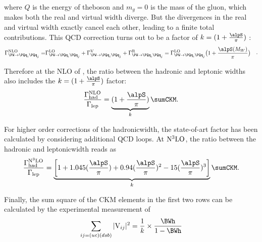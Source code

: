 \noindent  where $Q$ is the energy of the\PW boson and $m_g=0$ is the mass of the gluon, which makes both the real and virtual width diverge. But the divergences in the real and virtual width exactly cancel each other, leading to a finite total contributions. This QCD correction turns out to be a factor of $k=(1+\frac{\alpS}{\pi})$ :
\begin{equation}
\begin{split}
    \Gamma_{\PW \to \PQq_i \PQq_j}^{\rm NLO} =& \Gamma_{\PW \to \PQq_i \PQq_j}^{\rm LO} + \Gamma^{\rm V}_{\PW \to \PQq_i \PQq_j}  + \Gamma^{\rm R}_{\PW \to \PQq_i \PQq_j}
            =   \Gamma_{\PW \to \PQq_i \PQq_j}^{\rm LO} \big( 1+ \frac{\alpS(M_W)}{\pi}\big)
\end{split} .
\end{equation}

\noindent Therefore at the NLO of \alpS, the ratio between the hadronic and leptonic \PW widths also includes the $k=(1+\frac{\alpS}{\pi})$ factor:
\begin{equation}
    \frac{\Gamma_{\rm had}^{\rm NLO}}{\Gamma_{\rm lep}} =  \underbrace{(1+\frac{\alpS}{\pi})}_{k} \sumCKM. %
\end{equation}


\noindent For higher order \alpS corrections of the hadronic\PW width, the state-of-art factor has been calculated by considering additional QCD loops. At $\rm N^3LO$, the ratio between the hadronic and leptonic\PW width reads as 
\begin{equation}
    \frac{\Gamma_{\rm had}^{\rm N^3LO}}{\Gamma_{\rm lep}} =   \underbrace{ \bigg [ 1+1.045 ( \frac{\alpS}{\pi} ) + 0.94  ( \frac{\alpS}{\pi} ) ^2 -15  ( \frac{\alpS}{\pi} ) ^3 \bigg ]}_{k} \sumCKM.
\end{equation}

\noindent Finally, the sum square of the CKM elements in the first two rows can be calculated by the experimental measurement of \BWh
\begin{equation}
    \sum_{ij=(uc)(dsb)} |\mathrm{V}_{ij}|^2 = \frac{1}{k}\times \frac{\BWh }{1- \BWh}
\end{equation}



